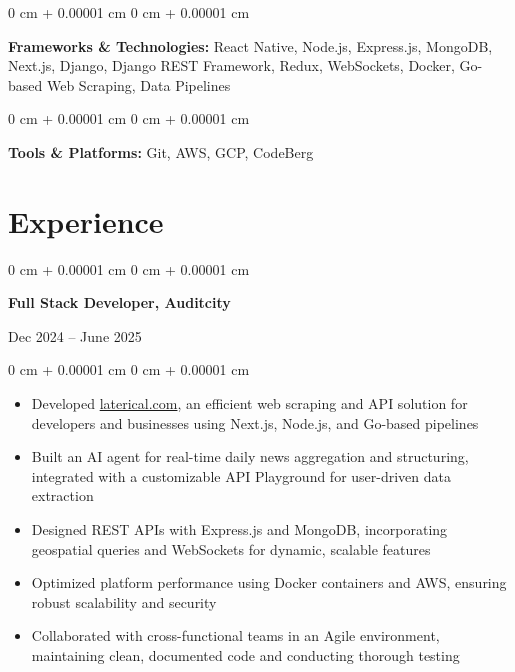 \documentclass[10pt, letterpaper]{article}
\newenvironment{highlights}{
    \begin{itemize}[
        topsep=0.10 cm,
        parsep=0.10 cm,
        partopsep=0pt,
        itemsep=0pt,
        leftmargin=0 cm + 10pt
    ]
}{
    \end{itemize}
} %
\newenvironment{onecolentry}{
    \begin{adjustwidth}{
        0 cm + 0.00001 cm
    }{
        0 cm + 0.00001 cm
    }
}{
    \end{adjustwidth}
} %
\newenvironment{twocolentry}[2][]{
    \onecolentry
    \def\secondColumn{#2}
    \setcolumnwidth{\fill, 4.5 cm}
    \begin{paracol}{2}
}{
    \switchcolumn \raggedleft \secondColumn
    \end{paracol}
    \endonecolentry
} %
\begin{document}
    \begin{onecolentry}
        \textbf{Frameworks \& Technologies:} React Native, Node.js, Express.js, MongoDB, Next.js, Django, Django REST Framework, Redux, WebSockets, Docker, Go-based Web Scraping, Data Pipelines
    \end{onecolentry}

    \vspace{0.2 cm}

    \begin{onecolentry}
        \textbf{Tools \& Platforms:} Git, AWS, GCP, CodeBerg
    \end{onecolentry}

    \section{Experience}
    \begin{twocolentry}{Dec 2024 -- June 2025}
        \textbf{Full Stack Developer, Auditcity}
    \end{twocolentry}
    \vspace{0.10 cm}
    \begin{onecolentry}
        \begin{highlights}
            \item Developed \href{https://laterical.com}{laterical.com}, an efficient web scraping and API solution for developers and businesses using Next.js, Node.js, and Go-based pipelines
            \item Built an AI agent for real-time daily news aggregation and structuring, integrated with a customizable API Playground for user-driven data extraction
            \item Designed REST APIs with Express.js and MongoDB, incorporating geospatial queries and WebSockets for dynamic, scalable features
            \item Optimized platform performance using Docker containers and AWS, ensuring robust scalability and security
            \item Collaborated with cross-functional teams in an Agile environment, maintaining clean, documented code and conducting thorough testing
        \end{highlights}
    \end{onecolentry}

    \vspace{0.2 cm}
\end{document}

